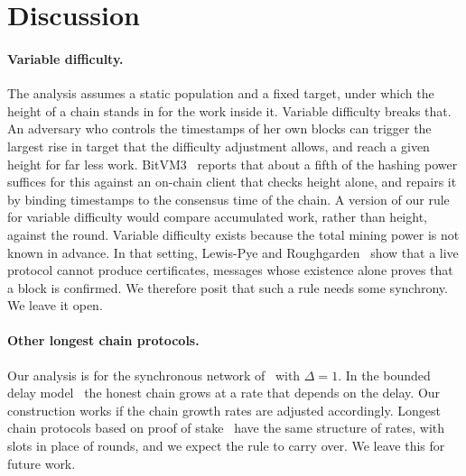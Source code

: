\section{Discussion}
\label{sec.discussion}

\paragraph{Variable difficulty.}
The analysis assumes a static population and a fixed target, under which the
height of a chain stands in for the work inside it. Variable difficulty breaks
that. An adversary who controls the timestamps of her own blocks can trigger
the largest rise in target that the difficulty adjustment allows, and reach a
given height for far less work. BitVM3~\cite{bitvm3} reports that about a fifth
of the hashing power suffices for this against an on-chain client that checks
height alone, and repairs it by binding timestamps to the consensus time of the
chain. A version of our rule for variable difficulty would compare accumulated
work, rather than height, against the round. Variable difficulty exists because
the total mining power is not known in advance. In that setting, Lewis-Pye and
Roughgarden~\cite{lpr21} show that a live protocol cannot produce certificates,
messages whose existence alone proves that a block is confirmed. We therefore
posit that such a rule needs some synchrony. We leave it open.

\paragraph{Other longest chain protocols.}

Our analysis is for the synchronous network of~\cite{gkl24} with $\Delta = 1$.
In the bounded delay model~\cite{gkl24,pss16} the honest chain grows at a rate
that depends on the delay. Our construction works if the chain growth rates are
adjusted accordingly.  Longest chain protocols based on proof of
stake~\cite{sleepy,genesis} have the same structure of rates, with slots in
place of rounds, and we expect the rule to carry over. We leave this for future
work.
